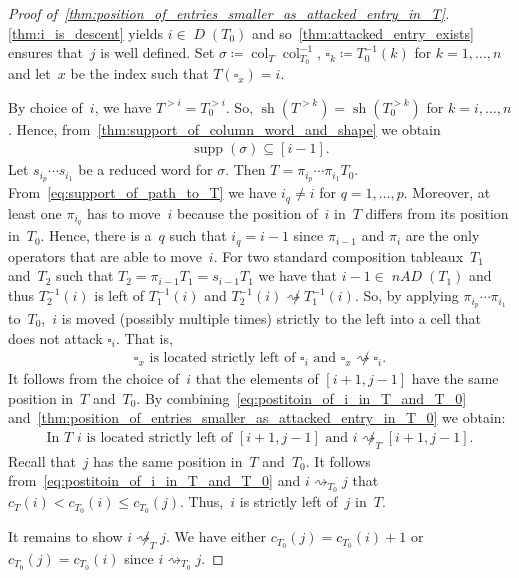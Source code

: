 \documentclass[ALCO,ThmDefs,Unicode,epreuves]{cedram}
\newcommand{\D}{\operatorname{\mathit{D}}}
\newcommand{\nAD}{\operatorname{\mathit{nAD}}}
\DeclareMathOperator{\sh}{sh}
\DeclareMathOperator{\supp}{supp}
\newcommand{\fs}{s}
\newcommand{\col}{\operatorname{col}}
\newcommand{\att}{\rightsquigarrow}
\newcommand{\cell}{\square}
\begin{document}
\begin{proof}[Proof of~\cref{thm:position_of_entries_smaller_as_attacked_entry_in_T}] 
	\cref{thm:i_is_descent} yields $i\in \D(T_0)$ and so~\cref{thm:attacked_entry_exists} ensures that~$j$ is well defined. Set $\sigma \coloneqq \col_T\col^{-1}_{T_0}$, $\cell_k \coloneqq T_0^{-1}(k)$ for $k=1,\dots, n$ and let~$x$ be the index such that $T(\cell_x)= i$. 

	 By choice of~$i$, we have $T^{>i} = T_0^{>i}$. So, $\sh (T^{>k}) = \sh (T_0^{>k})$ for $k = i ,\dots, n$. Hence, from~\cref{thm:support_of_column_word_and_shape} we obtain 
		\begin{align}
		\label{eq:support_of_path_to_T}
			\supp(\sigma) \subseteq [i-1].	
		\end{align}
	Let $\fs_{i_p} \cdots \fs_{i_1}$ be a reduced word for $\sigma$.
	Then $T = \pi_{i_p} \cdots \pi_{i_1} T_0$. From~\eqref{eq:support_of_path_to_T} we have $i_q \neq i$ for $q=1,\dots, p$.
	Moreover, at least one $\pi_{i_q}$ has to move~$i$ because the position of~$i$ in~$T$ differs from its position in~$T_0$. Hence, there is a~$q$ such that $i_q = i-1$ since $\pi_{i-1}$ and $\pi_i$ are the only operators that are able to move~$i$.
	For two standard composition tableaux~$T_1$ and~$T_2$ such that $T_2 = \pi_{i-1}T_1= \fs_{i-1} T_1$ we have that $i-1\in \nAD (T_1)$ and thus $T_2^{-1}(i)$ is left of $T_1^{-1}(i)$ and $T_2^{-1}(i) \not \att T_1^{-1}(i)$. So, by applying $\pi_{i_p} \cdots \pi_{i_1}$ to~$T_0$,~$i$ is moved (possibly multiple times) strictly to the left into a cell that does not attack $\cell_i$. That is,
	\begin{align}
		\label{eq:postitoin_of_i_in_T_and_T_0}
		\text{$\cell_x$ is located strictly left of $\cell_i$ and $\cell_x\not \att \cell_i$.}
	\end{align}
	It follows from the choice of~$i$ that the elements of $[i+1,j-1]$ have the same position in~$T$ and~$T_0$. By combining~\eqref{eq:postitoin_of_i_in_T_and_T_0} and~\cref{thm:position_of_entries_smaller_as_attacked_entry_in_T_0} we obtain:
	\begin{align}
	\text{In~$T$~$i$ is located strictly left of $[i+1,j-1]$ and $i\not \att_T [i+1,j-1]$.}
	\end{align}
	Recall that~$j$ has the same position in~$T$ and~$T_0$. 
	It follows from~\eqref{eq:postitoin_of_i_in_T_and_T_0} and $i\att_{T_0} j$ that $c_T(i) < c_{T_0}(i)\leq c_{T_0}(j)$. Thus,~$i$ is strictly left of~$j$ in~$T$.
	
	It remains to show $i\not \att_T j$.
	 We have either $c_{T_0}(j)=c_{T_0}(i)+1$ or $c_{T_0}(j)=c_{T_0}(i)$ since $i\att_{T_0} j$.
	

\end{proof}
\end{document}
